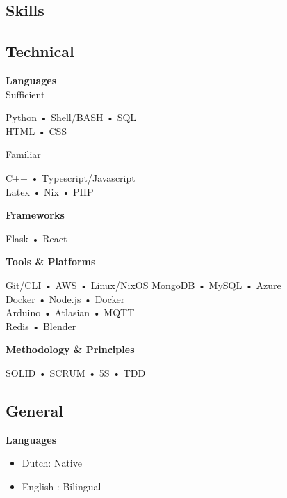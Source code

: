 \documentclass[11pt, twoside, a4paper, titlepage]{article}
\begin{document}
\begin{tcolorbox}[boxsep=0mm, left=0mm, right=0mm, top=0mm, bottom=0mm, height=23cm]
	\begin{minipage}[t]{6.01cm}
		\begin{tcolorbox}[colframe=black, colback=black, arc=0mm, sharp corners, fontupper=\color{white}, height=22.9cm]
			\section*{Skills}
			
			\subsection*{Technical}
			\textbf{Languages}\\
			\large{Sufficient}\\
			\small
			\parbox{5cm}{Python • Shell/BASH • SQL \\ HTML • CSS }
			
			\vspace*{0.2cm}
			
			\large{Familiar}\\
			\small
			\parbox{5cm}{C++ • Typescript/Javascript \\ Latex • Nix • PHP }
			
			\vspace*{0.4cm}
			
			\textbf{Frameworks}\\
			\parbox{5cm}{Flask • React}
			
			\vspace*{0.4cm}
			
			\textbf{Tools \& Platforms}\\
			\parbox{5cm}{Git/CLI • AWS • Linux/NixOS  MongoDB • MySQL • Azure \\ Docker • Node.js • Docker \\ Arduino • Atlasian • MQTT \\ Redis • Blender }
			
			\vspace*{0.4cm}
			
			\textbf{Methodology \& Principles}\\
			\parbox{5cm}{SOLID • SCRUM • 5S • TDD }
			
			\subsection*{General}
			
			\textbf{Languages}\\
			\begin{itemize}
				\item Dutch: Native
				\item English : Bilingual
			\end{itemize}
			

\end{tcolorbox}
\end{minipage}
\end{tcolorbox}
\end{document}
